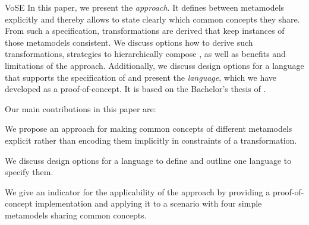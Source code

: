 \begin{copiedFrom}{VoSE}
In this paper, we present the \emph{\commonalities approach}. %
It defines \commonalities between metamodels explicitly and thereby allows to state clearly which common concepts they share.
From such a specification, transformations are derived that keep instances of those metamodels consistent.
We discuss options how to derive such transformations, strategies to hierarchically compose \commonalities, as well as benefits and limitations of the approach.
Additionally, we discuss design options for a language that supports the specification of \commonalities and present the \emph{\commonalities language}, which we have developed as a proof-of-concept.
It is based on the Bachelor's thesis of \textcite{gleitze2017a}. 

Our main contributions in this paper are:
\begin{description}[leftmargin=\parindent]
    \item[\contributionlabel{contrib:approach}{Commonalities Approach}{C1}:] We propose an approach for making common concepts of different metamodels explicit rather than encoding them implicitly in constraints of a transformation.
    \item[\contributionlabel{contrib:language}{Commonalities Language}{C2}:] We discuss design options for a language to define \commonalities and outline one language to specify them.
    \item[\contributionlabel{contrib:proofofconcept}{Proof-of-Concept}{C3}:] We give an indicator for the applicability of the approach by providing a proof-of-concept implementation and applying it to a scenario with four simple metamodels sharing common concepts. %
\end{description}


\end{copiedFrom}
